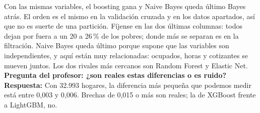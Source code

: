 \documentclass[aspectratio=169,11pt]{beamer}
\begin{document}
\begin{frame}{Con las mismas variables, el boosting gana y Naive Bayes queda último}
{    Bayes atrás. El orden es el mismo en la validación cruzada y en los datos apartados,
    así que no es suerte de una partición. Fíjense en las dos últimas columnas: todos
    dejan por fuera a un 20 a 26\,\% de los pobres; donde más se separan es en la
    filtración. Naive Bayes queda último porque supone que las variables son
    independientes, y aquí están muy relacionadas: ocupados, horas y cotizantes se mueven
    juntos. Los dos rivales más cercanos son Random Forest y Elastic Net.\\[3pt]
    \textbf{Pregunta del profesor: ¿son reales estas diferencias o es ruido?}
    \textbf{Respuesta:} Con 32.993 hogares, la diferencia más pequeña que podemos medir
    está entre 0,003 y 0,006. Brechas de 0,015 o más son reales; la de XGBoost frente a
    LightGBM, no.
  }
\end{frame}
\end{document}
